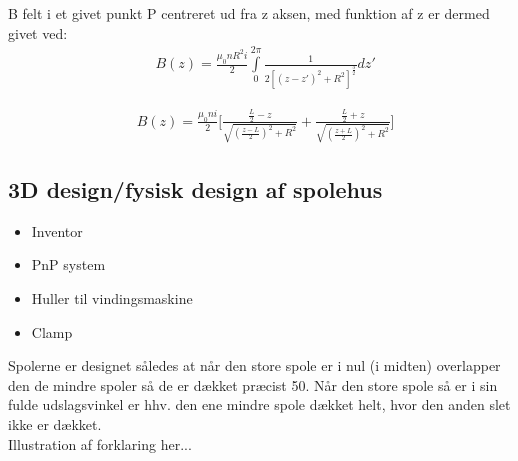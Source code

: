 B felt i et givet punkt P centreret ud fra z aksen, med funktion af z er dermed givet ved:
\begin{align}
	&B(z)=\frac{\mu_0 n R^2 i}{2}\int\limits_{0}^{2\pi}\frac{1}{2[(z-z')^2+R^2]^\frac{3}{2}}dz'
\end{align}

\begin{align}
	&B(z)=\frac{\mu_0 n i}{2}\bigg[\frac{\frac{L}{2}-z}{\sqrt{(\frac{z-L}{2})^2+R^2}}+\frac{\frac{L}{2}+z}{\sqrt{(\frac{z+L}{2})^2+R^2}}\bigg]
\end{align}

\subsection{3D design/fysisk design af spolehus}
\begin{itemize}
	\item Inventor
	\item PnP system
	\item Huller til vindingsmaskine
	\item Clamp
\end{itemize}
Spolerne er designet således at når den store spole er i nul (i midten) overlapper den de mindre spoler så de er dækket præcist 50\percent. Når den store spole så er i sin fulde udslagsvinkel er hhv. den ene mindre spole dækket helt, hvor den anden slet ikke er dækket. \\

Illustration af forklaring her...
